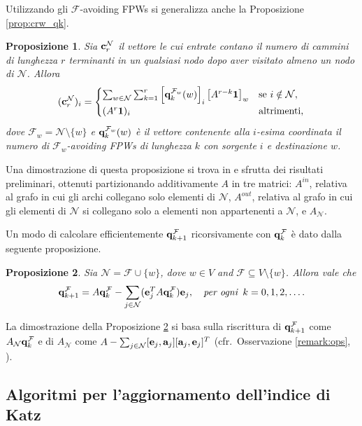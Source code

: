 \documentclass[a4paper]{article}
\newcommand{\evec}{{\bf e}}
\newcommand{\cvec}{{\bf c}}
\newcommand{\avec}{{\bf a}}
\newcommand{\qvec}{{\bf q}}
\newcommand{\bone}{\mathbf{1}}
\newcommand{\cN}{\mathcal{N}}
\newcommand{\cF}{\mathcal{F}}
\newcommand{\se}{\text{se }}
\newcommand{\altrimenti}{\text{altrimenti}}
\newtheorem{proposition}{Proposizione}
\begin{document}
	Utilizzando gli $\cF$-avoiding FPWs si generalizza anche la Proposizione \ref{prop:crw_qk}.
	
	\begin{proposition} \label{prop:qkfi}
		Sia $\cvec_r^\cN$ il vettore le cui entrate contano il numero di
		cammini di lunghezza $r$ terminanti in un qualsiasi nodo dopo aver
		visitato almeno un nodo di $\cN$. Allora
		\[
			(\cvec_r^\cN)_i = \begin{cases}
			\sum_{w \in \cN} \sum_{k=1}^r \left[\qvec_k^{\cF_w}(w) \right]_i \left[A^{r-k} \bone\right]_w & \se i \notin \cN, \\
			(A^r \bone)_i & \altrimenti,
			\end{cases}
		\]
		dove $\cF_w = \cN \setminus \{ w \}$ e $\qvec_k^{\cF_w}(w)$ è
		il vettore contenente alla $i$-esima coordinata il numero di
		$\cF_w$-avoiding FPWs di lunghezza $k$ con sorgente $i$ e destinazione
		$w$.
	\end{proposition}
	
	Una dimostrazione di questa proposizione si trova in \cite[Proposition 4]{katz2024} e sfrutta dei risultati preliminari, ottenuti partizionando
	additivamente $A$ in tre matrici: $A^{in}$, relativa al grafo in cui gli
	archi collegano solo elementi di $\cN$, $A^{out}$, relativa al grafo in cui
	gli elementi di $\cN$ si collegano solo a elementi non appartenenti a $\cN$,
	e $A_{\cN}$.
	
	Un modo di calcolare efficientemente $\qvec_{k+1}^\cF$ ricorsivamente
	con $\qvec_k^\cF$ è dato dalla seguente proposizione.
	
	\begin{proposition} \label{prop:qveccf}
		Sia $\cN = \cF \cup \{w\}$, dove $w \in V$ and $\cF \subseteq V \setminus \{w\}$. Allora vale che
		\[
			\qvec_{k+1}^\cF = A \qvec_k^\cF - \sum_{j \in \cN} (\evec_j^T A \qvec_k^\cF) \evec_j, \quad \textit{per ogni }\,k = 0, 1, 2, \ldots.
		\]
	\end{proposition}
	
	La dimostrazione della Proposizione \ref{prop:qveccf} si basa sulla
	riscrittura di $\qvec_{k+1}^\cF$ come $A_\cN \qvec_k^\cF$ e di
	$A_\cN$ come $A - \sum_{j \in \cN} [\evec_j, \avec_j][\avec_j, \evec_j]^T$ (cfr.~Osservazione \ref{remark:ops}, \cite[Proposition 5]{katz2024}).
	
	\subsection{Algoritmi per l'aggiornamento dell'indice di Katz}
	
\end{document}
